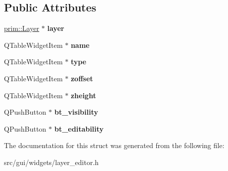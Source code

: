 \subsection*{Public Attributes}
\begin{DoxyCompactItemize}
\item 
\hyperlink{classprim_1_1Layer}{prim\+::\+Layer} $\ast$ {\bfseries layer}\hypertarget{structgui_1_1LayerEditor_1_1LayerTableRowContent_aca823bc3bfd2ce5115fbbdd8d3645e85}{}\label{structgui_1_1LayerEditor_1_1LayerTableRowContent_aca823bc3bfd2ce5115fbbdd8d3645e85}

\item 
Q\+Table\+Widget\+Item $\ast$ {\bfseries name}\hypertarget{structgui_1_1LayerEditor_1_1LayerTableRowContent_a98f3ba183d65a034d808ba6071c9e257}{}\label{structgui_1_1LayerEditor_1_1LayerTableRowContent_a98f3ba183d65a034d808ba6071c9e257}

\item 
Q\+Table\+Widget\+Item $\ast$ {\bfseries type}\hypertarget{structgui_1_1LayerEditor_1_1LayerTableRowContent_a10a3e47d0b543f5b5d4ec2b3894abcc3}{}\label{structgui_1_1LayerEditor_1_1LayerTableRowContent_a10a3e47d0b543f5b5d4ec2b3894abcc3}

\item 
Q\+Table\+Widget\+Item $\ast$ {\bfseries zoffset}\hypertarget{structgui_1_1LayerEditor_1_1LayerTableRowContent_a48ebeb071ea937001f8b89c987ca1d41}{}\label{structgui_1_1LayerEditor_1_1LayerTableRowContent_a48ebeb071ea937001f8b89c987ca1d41}

\item 
Q\+Table\+Widget\+Item $\ast$ {\bfseries zheight}\hypertarget{structgui_1_1LayerEditor_1_1LayerTableRowContent_a5e64e566cf9c08d68e08393749314cae}{}\label{structgui_1_1LayerEditor_1_1LayerTableRowContent_a5e64e566cf9c08d68e08393749314cae}

\item 
Q\+Push\+Button $\ast$ {\bfseries bt\+\_\+visibility}\hypertarget{structgui_1_1LayerEditor_1_1LayerTableRowContent_a637f78395d8662bef46a210ae3e91dae}{}\label{structgui_1_1LayerEditor_1_1LayerTableRowContent_a637f78395d8662bef46a210ae3e91dae}

\item 
Q\+Push\+Button $\ast$ {\bfseries bt\+\_\+editability}\hypertarget{structgui_1_1LayerEditor_1_1LayerTableRowContent_a71c0d00395ad8f15ab758b2a0ff2266e}{}\label{structgui_1_1LayerEditor_1_1LayerTableRowContent_a71c0d00395ad8f15ab758b2a0ff2266e}

\end{DoxyCompactItemize}


The documentation for this struct was generated from the following file\+:\begin{DoxyCompactItemize}
\item 
src/gui/widgets/layer\+\_\+editor.\+h\end{DoxyCompactItemize}
